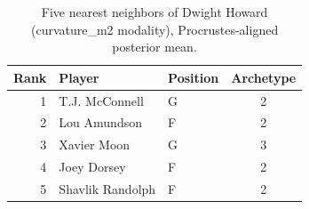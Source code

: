 \begin{table}[htbp]
  \centering\small
  \begin{tabular}{rllc}
    \toprule
    Rank & Player & Position & Archetype \\
    \midrule
    1 & T.J. McConnell & G & 2 \\
    2 & Lou Amundson & F & 2 \\
    3 & Xavier Moon & G & 3 \\
    4 & Joey Dorsey & F & 2 \\
    5 & Shavlik Randolph & F & 2 \\
    \bottomrule
  \end{tabular}
  \caption{Five nearest neighbors of Dwight Howard (curvature_m2 modality), Procrustes-aligned posterior mean.}
  \label{tab:Dwight_Howard_neighbors_curvature_m2}
\end{table}

